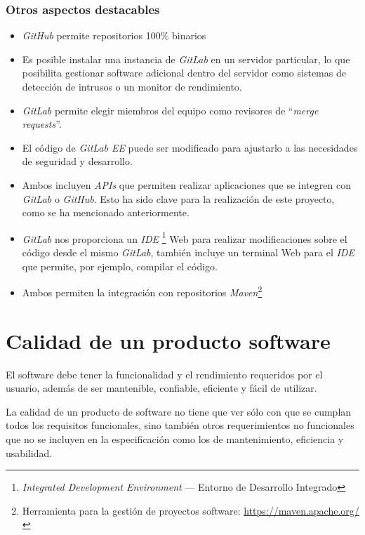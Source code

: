 \subsubsection{Otros aspectos destacables}
\begin{itemize}
	\tightlist
	\item \textit{GitHub} permite repositorios 100\% binarios
	\item Es posible instalar una instancia de \textit{GitLab} en un servidor particular, lo que posibilita gestionar software adicional dentro del servidor como sistemas de detección de intrusos o un monitor de rendimiento.
	\item \textit{GitLab} permite elegir miembros del equipo como revisores de ``\textit{merge requests}''.
	\item El código de \textit{GitLab EE} puede ser modificado para ajustarlo a las necesidades de seguridad y desarrollo.
	\item Ambos incluyen \textit{APIs} que permiten realizar aplicaciones que se integren con \textit{GitLab} o  \textit{GitHub}. Esto ha sido clave para la realización de este proyecto, como se ha mencionado anteriormente.
	\item \textit{GitLab} nos proporciona un \textit{IDE} \footnote{\textit{Integrated Development Environment} --- Entorno de Desarrollo Integrado } Web para realizar modificaciones sobre el código desde el mismo \textit{GitLab}, también incluye un terminal Web para el \textit{IDE} que permite, por ejemplo, compilar el código.
	\item Ambos permiten la integración con repositorios \textit{Maven}\footnote{Herramienta para la gestión de proyectos software: \url{https://maven.apache.org/}}
\end{itemize}

\section{Calidad de un producto software}

El software debe tener la funcionalidad y el rendimiento requeridos por el usuario, además de ser mantenible, confiable, eficiente y fácil de utilizar.

La calidad de un producto de software no tiene que ver sólo con que se cumplan todos los requisitos funcionales, sino también otros requerimientos no funcionales que no se incluyen en la especificación como los de mantenimiento, eficiencia y usabilidad.

